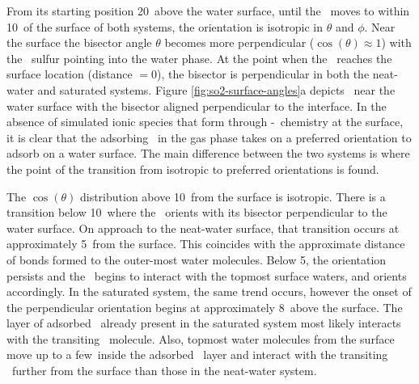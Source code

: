 	From its starting position 20\angs~above the water surface, until the \suldiox~moves to within 10\angs~of the surface of both systems, the orientation is isotropic in $\theta$ and $\phi$. Near the surface the bisector angle $\theta$ becomes more perpendicular ($\cos(\theta)\approx1$) with the \suldiox~sulfur pointing into the water phase. At the point when the \suldiox~reaches the surface location (distance $=0$\angs), the bisector is perpendicular in both the neat-water and saturated systems. Figure \ref{fig:so2-surface-angles}a depicts \suldiox~near the water surface with the bisector aligned perpendicular to the interface. In the absence of simulated ionic species that form through \suldiox-\wat~chemistry at the surface, it is clear that the adsorbing \suldiox~in the gas phase takes on a preferred orientation to adsorb on a water surface. The main difference between the two systems is where the point of the transition from isotropic to preferred orientations is found. 
 
  The $\cos(\theta)$ distribution above 10\angs~from the surface is isotropic. There is a transition below 10\angs~where the \suldiox~orients with its bisector perpendicular to the water surface. On approach to the neat-water surface, that transition occurs at approximately 5\angs~from the surface. This coincides with the approximate distance of bonds formed to the outer-most water molecules. Below 5\angs, the orientation persists and the \suldiox~begins to interact with the topmost surface waters, and orients accordingly. In the saturated system, the same trend occurs, however the onset of the perpendicular orientation begins at approximately 8\angs~above the surface. The layer of adsorbed \suldiox~already present in the saturated system most likely interacts with the transiting \suldiox~molecule. Also, topmost water molecules from the surface move up to a few\angs~inside the adsorbed \suldiox~layer and interact with the transiting \suldiox~further from the surface than those in the neat-water system.

